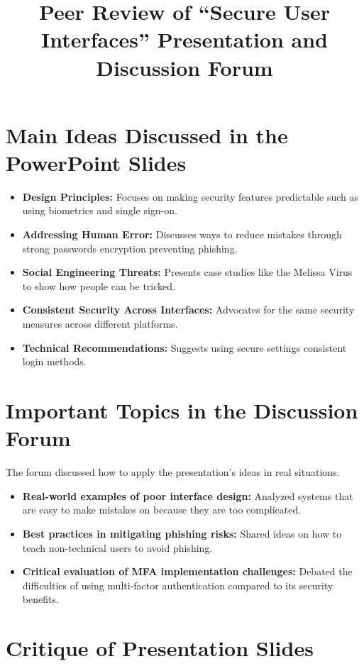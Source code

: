 \documentclass{article}
\title{Peer Review of “Secure User Interfaces” Presentation and Discussion Forum}
\date{}
\begin{document}
\maketitle

\section{Main Ideas Discussed in the PowerPoint Slides}

\begin{itemize}
    \item \textbf{Design Principles:} Focuses on making security features predictable such as using biometrics and single sign-on.
    \item \textbf{Addressing Human Error:} Discusses ways to reduce mistakes through strong passwords encryption preventing phishing.
    \item \textbf{Social Engineering Threats:} Presents case studies like the Melissa Virus to show how people can be tricked.
    \item \textbf{Consistent Security Across Interfaces:} Advocates for the same security measures across different platforms.
    \item \textbf{Technical Recommendations:} Suggests using secure settings consistent login methods.
\end{itemize}

\section{Important Topics in the Discussion Forum}
The forum discussed how to apply the presentation’s ideas in real situations.
\begin{itemize}
    \item \textbf{Real-world examples of poor interface design:} Analyzed systems that are easy to make mistakes on because they are too complicated.
    \item \textbf{Best practices in mitigating phishing risks:} Shared ideas on how to teach non-technical users to avoid phishing.
    \item \textbf{Critical evaluation of MFA implementation challenges:} Debated the difficulties of using multi-factor authentication compared to its security benefits.
\end{itemize}

\section{Critique of Presentation Slides}
\end{document}
